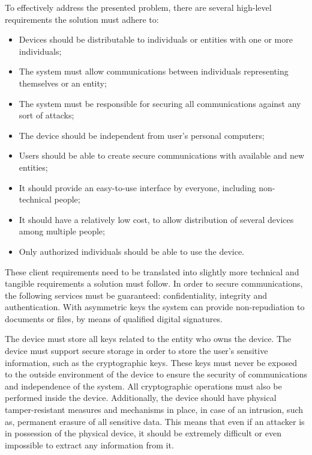 To effectively address the presented problem, there are several high-level requirements the solution must adhere to:
\begin{itemize}
	\item Devices should be distributable to individuals or entities with one or more individuals;
	\item The system must allow communications between individuals representing themselves or an entity;
	\item The system must be responsible for securing all communications against any sort of attacks;
	\item The device should be independent from user's personal computers;
	\item Users should be able to create secure communications with available and new entities;
	\item It should provide an easy-to-use interface by everyone, including non-technical people;
	\item It should have a relatively low cost, to allow distribution of several devices among multiple people;
	\item Only authorized individuals should be able to use the device.
\end{itemize}

These client requirements need to be translated into slightly more technical and tangible requirements a solution must follow.
In order to secure communications, the following services must be guaranteed: confidentiality, integrity and authentication.
With asymmetric keys the system can provide non-repudiation to documents or files, by means of qualified digital signatures.

The device must store all keys related to the entity who owns the device.
The device must support secure storage in order to store the user's sensitive information, such as the cryptographic keys.
These keys must never be exposed to the outside environment of the device to ensure the security of communications and independence of the system.
All cryptographic operations must also be performed inside the device.
Additionally, the device should have physical tamper-resistant measures and mechanisms in place, in case of an intrusion, such as, permanent erasure of all sensitive data. 
This means that even if an attacker is in possession of the physical device, it should be extremely difficult or even impossible to extract any information from it.

